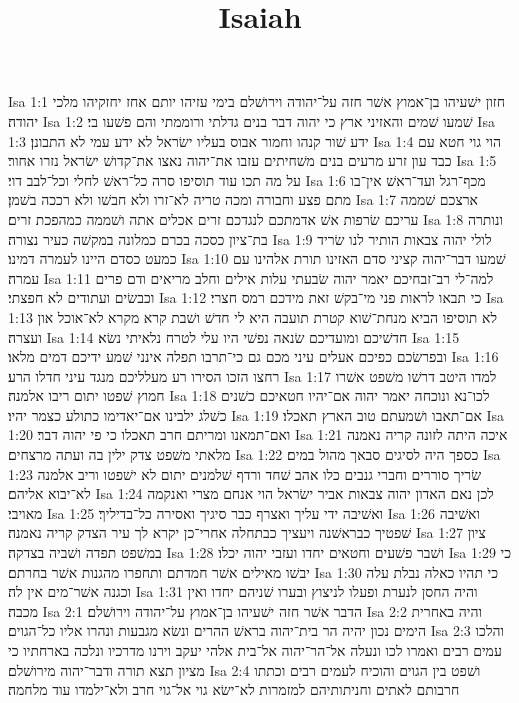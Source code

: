 

\title{Isaiah}

Isa 1:1  חזון ישׁעיהו בן־אמוץ אשׁר חזה על־יהודה וירושׁלם בימי עזיהו יותם אחז יחזקיהו מלכי יהודה׃
Isa 1:2  שׁמעו שׁמים והאזיני ארץ כי יהוה דבר בנים גדלתי ורוממתי והם פשׁעו בי׃
Isa 1:3  ידע שׁור קנהו וחמור אבוס בעליו ישׂראל לא ידע עמי לא התבונן׃
Isa 1:4  הוי גוי חטא עם כבד עון זרע מרעים בנים משׁחיתים עזבו את־יהוה נאצו את־קדושׁ ישׂראל נזרו אחור׃
Isa 1:5  על מה תכו עוד תוסיפו סרה כל־ראשׁ לחלי וכל־לבב דוי׃
Isa 1:6  מכף־רגל ועד־ראשׁ אין־בו מתם פצע וחבורה ומכה טריה לא־זרו ולא חבשׁו ולא רככה בשׁמן׃
Isa 1:7  ארצכם שׁממה עריכם שׂרפות אשׁ אדמתכם לנגדכם זרים אכלים אתה ושׁממה כמהפכת זרים׃
Isa 1:8  ונותרה בת־ציון כסכה בכרם כמלונה במקשׁה כעיר נצורה׃
Isa 1:9  לולי יהוה צבאות הותיר לנו שׂריד כמעט כסדם היינו לעמרה דמינו׃
Isa 1:10  שׁמעו דבר־יהוה קציני סדם האזינו תורת אלהינו עם עמרה׃
Isa 1:11  למה־לי רב־זבחיכם יאמר יהוה שׂבעתי עלות אילים וחלב מריאים ודם פרים וכבשׂים ועתודים לא חפצתי׃
Isa 1:12  כי תבאו לראות פני מי־בקשׁ זאת מידכם רמס חצרי׃
Isa 1:13  לא תוסיפו הביא מנחת־שׁוא קטרת תועבה היא לי חדשׁ ושׁבת קרא מקרא לא־אוכל און ועצרה׃
Isa 1:14  חדשׁיכם ומועדיכם שׂנאה נפשׁי היו עלי לטרח נלאיתי נשׂא׃
Isa 1:15  ובפרשׂכם כפיכם אעלים עיני מכם גם כי־תרבו תפלה אינני שׁמע ידיכם דמים מלאו׃
Isa 1:16  רחצו הזכו הסירו רע מעלליכם מנגד עיני חדלו הרע׃
Isa 1:17  למדו היטב דרשׁו משׁפט אשׁרו חמוץ שׁפטו יתום ריבו אלמנה׃
Isa 1:18  לכו־נא ונוכחה יאמר יהוה אם־יהיו חטאיכם כשׁנים כשׁלג ילבינו אם־יאדימו כתולע כצמר יהיו׃
Isa 1:19  אם־תאבו ושׁמעתם טוב הארץ תאכלו׃
Isa 1:20  ואם־תמאנו ומריתם חרב תאכלו כי פי יהוה דבר׃
Isa 1:21  איכה היתה לזונה קריה נאמנה מלאתי משׁפט צדק ילין בה ועתה מרצחים׃
Isa 1:22  כספך היה לסיגים סבאך מהול במים׃
Isa 1:23  שׂריך סוררים וחברי גנבים כלו אהב שׁחד ורדף שׁלמנים יתום לא ישׁפטו וריב אלמנה לא־יבוא אליהם׃
Isa 1:24  לכן נאם האדון יהוה צבאות אביר ישׂראל הוי אנחם מצרי ואנקמה מאויבי׃
Isa 1:25  ואשׁיבה ידי עליך ואצרף כבר סיגיך ואסירה כל־בדיליך׃
Isa 1:26  ואשׁיבה שׁפטיך כבראשׁנה ויעציך כבתחלה אחרי־כן יקרא לך עיר הצדק קריה נאמנה׃
Isa 1:27  ציון במשׁפט תפדה ושׁביה בצדקה׃
Isa 1:28  ושׁבר פשׁעים וחטאים יחדו ועזבי יהוה יכלו׃
Isa 1:29  כי יבשׁו מאילים אשׁר חמדתם ותחפרו מהגנות אשׁר בחרתם׃
Isa 1:30  כי תהיו כאלה נבלת עלה וכגנה אשׁר־מים אין לה׃
Isa 1:31  והיה החסן לנערת ופעלו לניצוץ ובערו שׁניהם יחדו ואין מכבה׃
Isa 2:1  הדבר אשׁר חזה ישׁעיהו בן־אמוץ על־יהודה וירושׁלם׃
Isa 2:2  והיה באחרית הימים נכון יהיה הר בית־יהוה בראשׁ ההרים ונשׂא מגבעות ונהרו אליו כל־הגוים׃
Isa 2:3  והלכו עמים רבים ואמרו לכו ונעלה אל־הר־יהוה אל־בית אלהי יעקב וירנו מדרכיו ונלכה בארחתיו כי מציון תצא תורה ודבר־יהוה מירושׁלם׃
Isa 2:4  ושׁפט בין הגוים והוכיח לעמים רבים וכתתו חרבותם לאתים וחניתותיהם למזמרות לא־ישׂא גוי אל־גוי חרב ולא־ילמדו עוד מלחמה׃
